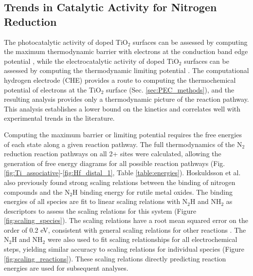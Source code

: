 \subsection{Trends in Catalytic Activity for Nitrogen Reduction}
\label{sec:cat_trends}
The photocatalytic activity of doped TiO$_2$ surfaces can be assessed by computing the maximum thermodynamic barrier with electrons at the conduction band edge potential \cite{Comer_2018}, while the electrocatalytic activity of doped TiO$_2$ surfaces can be assessed by computing the thermodynamic limiting potential \cite{Norskov_2004,Garc_a_Mota_2011}. The computational hydrogen electrode (CHE) provides a route to computing the thermochemical potential of electrons at the TiO$_2$ surface (Sec. \ref{sec:PEC_methods}), and the resulting analysis provides only a thermodynamic picture of the reaction pathway. This analysis establishes a lower bound on the kinetics and correlates well with experimental trends in the literature\cite{Seh_2017}.

Computing the maximum barrier or limiting potential requires the free energies of each state along a given reaction pathway. The full thermodynamics of the N$_2$ reduction reaction pathways on all 2+ sites were calculated, allowing the generation of free energy diagrams for all possible reaction pathways (Fig. \ref{fig:Ti_associative}-\ref{fig:Hf_distal_1}, Table \ref{table:energies}). Hoskuldsson et al. \cite{Hoskuldsson_2017} also previously found strong scaling relations between the binding of nitrogen compounds and the N$_2$H binding energy for rutile metal oxides. The binding energies of all species are fit to linear scaling relations with N$_2$H and NH$_2$ as descriptors to assess the scaling relations for this system (Figure \ref{fig:scaling_species}). The scaling relations have a root mean squared error on the order of 0.2 eV, consistent with general scaling relations for other reactions \cite{Wang_2011}. The N$_2$H and NH$_2$ were also used to fit scaling relationships for all electrochemical steps, yielding similar accuracy to scaling relations for individual species (Figure \ref{fig:scaling_reactions}). These scaling relations directly predicting reaction energies are used for subsequent analyses.









